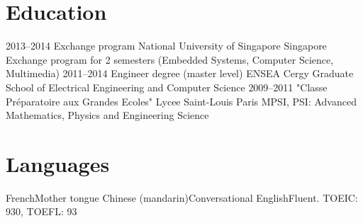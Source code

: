 \documentclass[11pt,a4paper,sans]{moderncv}        %
\begin{document}
\section{Education}
\cventry
  {2013--2014}
  {Exchange program}
  {National University of Singapore}
  {Singapore}
  {}
  {Exchange program for 2 semesters (Embedded Systems, Computer Science, Multimedia)}  %
\cventry
  {2011--2014}
  {Engineer degree (master level)}
  {ENSEA}
  {Cergy}
  {}
  {Graduate School of Electrical Engineering and Computer Science}
\cventry
  {2009--2011}
  {"Classe Préparatoire aux Grandes Ecoles"}
  {Lycee Saint-Louis}
  {Paris}
  {}
  {MPSI, PSI: Advanced Mathematics, Physics and Engineering Science}


\section{Languages}
\cvdoubleitem
  {French}{Mother tongue}
  {Chinese (mandarin)}{Conversational}
\cvdoubleitem
  {English}{Fluent. TOEIC: 930, TOEFL: 93}
  {}{}

\end{document}
